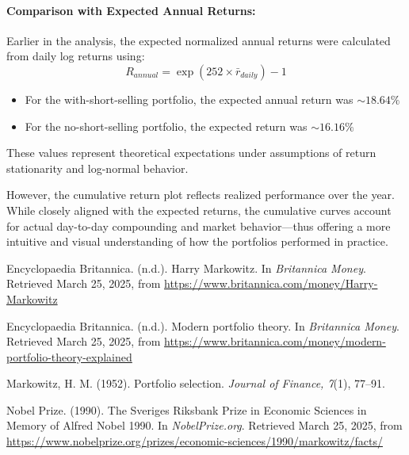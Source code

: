 \documentclass[12pt]{article}
\begin{document}
\paragraph{Comparison with Expected Annual Returns:}
Earlier in the analysis, the expected normalized annual returns were calculated from daily log returns using:
\[R_{annual}=\exp(252\times \bar{r}_{daily})-1\]
\begin{itemize}
    \item For the with-short-selling portfolio, the expected annual return was $\sim 18.64\%$
    \item For the no-short-selling portfolio, the expected return was $\sim 16.16\%$
\end{itemize}
These values represent theoretical expectations under assumptions of return stationarity and log-normal behavior.\par
However, the cumulative return plot reflects realized performance over the year. While closely aligned with the expected returns, the cumulative curves account for actual day-to-day compounding and market behavior—thus offering a more intuitive and visual understanding of how the portfolios performed in practice.

\newpage

\begin{spacing}{1.5}
\begin{thebibliography}{9}

Encyclopaedia Britannica. (n.d.). Harry Markowitz. In \textit{Britannica Money}. Retrieved March 25, 2025, from \url{https://www.britannica.com/money/Harry-Markowitz}

Encyclopaedia Britannica. (n.d.). Modern portfolio theory. In \textit{Britannica Money}. Retrieved March 25, 2025, from \url{https://www.britannica.com/money/modern-portfolio-theory-explained}

Markowitz, H. M. (1952). Portfolio selection. \textit{Journal of Finance, 7}(1), 77--91.

Nobel Prize. (1990). The Sveriges Riksbank Prize in Economic Sciences in Memory of Alfred Nobel 1990. In \textit{NobelPrize.org}. Retrieved March 25, 2025, from \url{https://www.nobelprize.org/prizes/economic-sciences/1990/markowitz/facts/}

\end{thebibliography}
\end{spacing}
\end{document}
